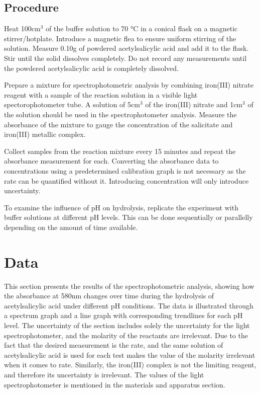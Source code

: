 \documentclass{article}
\begin{document}
\subsection{Procedure}
Heat 100$\text{cm}^3$ of the buffer solution to 70 °C in a conical flask on a magnetic stirrer/hotplate. Introduce a magnetic flea to ensure uniform stirring of the solution. Measure 0.10g of powdered acetylsalicylic acid and add it to the flask. Stir until the solid dissolves completely. Do not record any measurements until the powdered acetylsalicylic acid is completely dissolved.

Prepare a mixture for spectrophotometric analysis by combining iron(III) nitrate reagent with a sample of the reaction solution in a visible light spectorophotometer tube. A solution of 5$\text{cm}^3$ of the iron(III) nitrate and 1$\text{cm}^3$ of the solution should be used in the spectrophotometer analysis. Measure the absorbance of the mixture to gauge the concentration of the salicitate and iron(III) metallic complex. 

Collect samples from the reaction mixture every 15 minutes and repeat the absorbance measurement for each. Converting the absorbance data to concentrations using a predetermined calibration graph is not necessary as the rate can be quantified without it. Introducing concentration will only introduce uncertainty.

To examine the influence of pH on hydrolysis, replicate the experiment with buffer solutions at different pH levels. This can be done sequentially or parallelly depending on the amount of time available.

\section{Data}

This section presents the results of the spectrophotometric analysis, showing how the absorbance at 580nm changes over time during the hydrolysis of acetylsalicylic acid under different pH conditions. The data is illustrated through a spectrum graph and a line graph with corresponding trendlines for each pH level. The uncertainty of the section includes solely the uncertainty for the light spectrophotometer, and the molarity of the reactants are irrelevant. Due to the fact that the desired measurement is the rate, and the same solution of acetylsalicylic acid is used for each test makes the value of the molarity irrelevant when it comes to rate. Similarly, the iron(III) complex is not the limiting reagent, and therefore its uncertainty is irrelevant. The values of the light spectrophotometer is mentioned in the materials and apparatus section.
\end{document}
